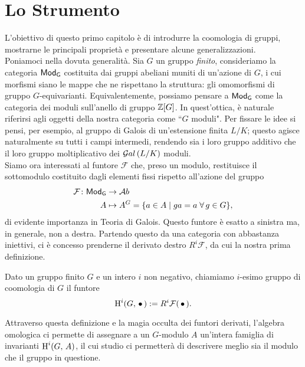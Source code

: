 \chapter{Lo Strumento}


L'obiettivo di questo primo capitolo è di introdurre la coomologia di gruppi, mostrarne le principali proprietà e presentare alcune generalizzazioni.\\

Poniamoci nella dovuta generalità. Sia $ G $ un gruppo \emph{finito}, consideriamo la categoria $ \mathsf{Mod}_\mathsf{G} $ costituita dai gruppi abeliani muniti di un'azione di $ G $, i cui morfismi siano le mappe che ne rispettano la struttura: gli omomorfismi di gruppo $ G $-equivarianti. Equivalentemente, possiamo pensare a $ \mathsf{Mod}_\mathsf{G} $ come la categoria dei moduli sull'anello di gruppo $ \mathbb{Z}[G] $. In quest'ottica, è naturale riferirsi agli oggetti della nostra categoria come \textquotedblleft$ G $ moduli".
Per fissare le idee si pensi, per esempio, al gruppo di Galois di un'estensione finita $ L/K $; questo agisce naturalmente su tutti i campi intermedi, rendendo sia i loro gruppo additivo che il loro gruppo moltiplicativo dei $ \mathcal{G}al\left( L/K \right) $ moduli. \\

Siamo ora interessati al funtore $ \mathcal{F} $ che, preso un modulo, restituisce il sottomodulo costituito dagli elementi fissi rispetto  all'azione del gruppo
\begin{align*} 
\mathcal{F} \colon \mathsf{Mod}_\mathsf{G} &\to \mathcal{A}b \\
A &\mapsto A^G = \{ a \in A \mid ga = a \; \forall \, g \in G \},
\end{align*}
di evidente importanza in Teoria di Galois. Questo funtore è esatto a sinistra ma, in generale, non a destra. Partendo questo da una categoria con abbastanza iniettivi, ci è concesso prenderne il derivato destro $ R^i\mathcal{F} $, da cui la nostra prima definizione.

\begin{definition}
	Dato un gruppo finito $ G $ e un intero $ i $ non negativo, chiamiamo $ i $-esimo gruppo di coomologia di $ G $ il funtore
	\[ \operatorname{H}^i(G, \, \bullet\,) : = R^i\mathcal{F}(\,\bullet\,). \]
\end{definition}

Attraverso questa definizione e la magia occulta dei funtori derivati, l'algebra omologica ci permette di assegnare a un $ G $-modulo $ A $ un'intera famiglia di invarianti $ \operatorname{H}^i(G, \, A) $, il cui studio ci permetterà di descrivere meglio sia il modulo che il gruppo in questione. 

